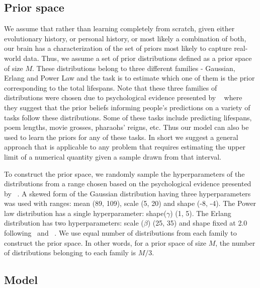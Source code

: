 \documentclass[10pt,letterpaper]{article}
\begin{document}
\subsection{Prior space}


We assume that rather than learning completely from scratch, given either evolutionary history, or personal history, or most likely a combination of both, our brain has a characterization of the set of priors most likely to capture real-world data. Thus, we assume a set of prior distributions defined as a prior space of size $M$. These distributions belong to three different families - Gaussian, Erlang and Power Law and the task is to estimate which one of them is the prior corresponding to the total lifespans. Note that these three families of distributions were chosen due to psychological evidence presented by ~ where they suggest that the prior beliefs informing people's predictions on a variety of tasks follow these distributions. Some of these tasks include predicting lifespans, poem lengths, movie grosses, pharaohs' reigns, etc. Thus our model can also be used to learn the priors for any of these tasks. In short we suggest a general approach that is applicable to any problem that requires estimating the upper limit of a numerical quantity given a sample drawn from that interval.

To construct the prior space, we randomly sample the hyperparameters of the distributions from a range chosen based on the psychological evidence presented by ~. A skewed form of the Gaussian distribution having three hyperparameters was used with ranges: mean (89, 109), scale (5, 20) and shape (-8, -4). The Power law distribution has a single hyperparameter: shape($\gamma$) (1, 5). The Erlang distribution has two hyperparameters: scale ($\beta$) (25, 35) and shape fixed at 2.0 following~ and ~. We use equal number of distributions from each family to construct the prior space. In other words, for a prior space of size $M$, the number of distributions belonging to each family is $M/3$.

\subsection{Model} 
\end{document}
